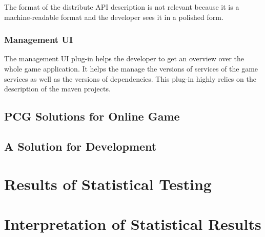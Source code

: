 The format of the distribute API description is not relevant because it is a
machine-readable format and the developer sees it in a polished form.

\subsubsection{Management UI}

The management UI plug-in helps the developer to get an overview over the whole
game application. It helps the manage the versions of services of the game
services as well as the versions of dependencies. This plug-in highly relies on
the description of the maven projects.

\subsection{PCG Solutions for Online Game}

\subsection{A Solution for \ms{} Development}

\section{Results of Statistical Testing}

\section{Interpretation of Statistical Results}
